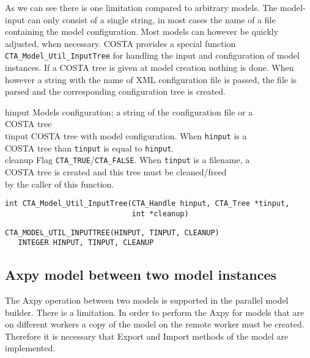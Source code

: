 As we can see there is one limitation compared to arbitrary models. The
model-input can only consist of a single string, in most cases the name of
a file containing the model configuration. Most models can however be quickly
adjusted, when necessary. COSTA provides a special function {\tt
CTA\_Model\_Util\_InputTree} for handling
the input and configuration of model instances. If a COSTA tree is given
at model creation nothing is done. When however a string with the name of
XML configuration file is passed, the file is parsed and the corresponding
configuration tree is created.

\horzline
\begin{tabbing}
\functab
{}
  {hinput}  {Models configuration; a string of the
configuration file or a}\\
\funcline{}    {}        {COSTA tree}\\
 {tinput}  {COSTA tree with model configuration.
                          When {\tt hinput} is a }\\
\funcline{}    {}        {COSTA tree than {\tt tinput} is equal to
                          {\tt hinput}.}\\
 {cleanup}  {Flag {\tt CTA\_TRUE}/{\tt CTA\_FALSE}. When
{\tt tinput} is a filename, a }\\
\funcline{}    {}        {COSTA tree is created and this tree must be
cleaned/freed }\\
\funcline{}    {}        {by the caller of this function.}\\
\end{tabbing}
\horzline

\begin{verbatim}
int CTA_Model_Util_InputTree(CTA_Handle hinput, CTA_Tree *tinput,
                             int *cleanup)
\end{verbatim}

\begin{verbatim}
CTA_MODEL_UTIL_INPUTTREE(HINPUT, TINPUT, CLEANUP)
   INTEGER HINPUT, TINPUT, CLEANUP
\end{verbatim}

\subsection{Axpy model between two model instances}
The Axpy operation between two models is supported in the parallel model
builder. There is a limitation. In order to perform the Axpy for models
that are on different workers a copy of the model on the remote worker must
be created. Therefore it is necessary that Export and Import methods of the
model are implemented.

